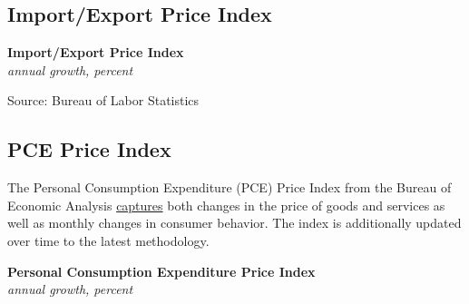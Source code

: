 \documentclass{report}
\makeatletter
\newcommand{\tbllink}[1]{\href{https://raw.githubusercontent.com/bdecon/US-chartbook/master/chartbook/data/#1}{\faTable}}
\newcommand*\short[1]{\expandafter\@gobbletwo\number\numexpr#1\relax}
\newcommand{\dateaxisticks}{
		date coordinates in=x, axis line style={draw=none},
		xmax={2021-06-15},
		max space between ticks=40,	    
		xtick={{1990-01-01}, {1992-01-01}, {1994-01-01}, 
			{1996-01-01}, {1998-01-01}, {2000-01-01}, 
			{2002-01-01}, {2004-01-01}, {2006-01-01},
			{2008-01-01}, {2010-01-01}, {2012-01-01}, {2014-01-01},
		    {2016-01-01}, {2018-01-01}, {2020-01-01}},
		minor xtick={{1989-01-01}, {1991-01-01}, {1993-01-01},
			{1995-01-01}, {1997-01-01}, {1999-01-01}, 
			{2001-01-01}, {2003-01-01}, {2005-01-01}, {2007-01-01},
		    {2009-01-01}, {2011-01-01}, {2013-01-01}, {2015-01-01},
		    {2017-01-01}, {2019-01-01}, {2021-01-01}},
		enlarge y limits={0.06}, enlarge x limits={0.01},
		}
\newcommand{\bbar}[2]{extra #1 ticks = {{#2}}, extra #1 tick labels = ,
		extra #1 tick style = {grid=major, grid style={thick, black!25}},}
\newcommand{\stdline}[4]{\addplot[very thick, no markers, color=#1] 
		table [x=#2, y=#3, col sep=comma] {#4};	}
\newcommand{\rbars}{
		\fill[color=black!10] (axis cs:{1990-07-01},\pgfkeysvalueof{/pgfplots/ymin}) rectangle 
			(axis cs:{1991-03-01}, \pgfkeysvalueof{/pgfplots/ymax});
		\fill[color=black!10] (axis cs:{2007-12-01},\pgfkeysvalueof{/pgfplots/ymin}) rectangle 
			(axis cs:{2009-07-01}, \pgfkeysvalueof{/pgfplots/ymax});
		\fill[color=black!10] (axis cs:{2001-03-01},\pgfkeysvalueof{/pgfplots/ymin}) rectangle 
			(axis cs:{2001-11-01}, \pgfkeysvalueof{/pgfplots/ymax});
		\fill[color=black!10] (axis cs:{2020-02-01},\pgfkeysvalueof{/pgfplots/ymin}) rectangle 
			(axis cs:{2021-06-15}, \pgfkeysvalueof{/pgfplots/ymax});}
\makeatother
\begin{document}
{{\newpage
\subsection*{\color{black!70} \seriffont Import/Export Price Index}
\begin{minipage}{0.76\textwidth}
\small 
\vspace{1mm}

\normalsize \textbf{Import/Export Price Index}\\
\footnotesize{\textit{annual growth, percent}}\\
\vspace{22mm}

\hspace{4mm} 
\vspace{1mm}

\footnotesize{Source: Bureau of Labor Statistics} \hfill \tbllink{mxpi.csv}
\vspace{8mm}

\subsection*{\color{black!70} \seriffont PCE Price Index}
\small The Personal Consumption Expenditure (PCE) Price Index from the Bureau of Economic Analysis \href{https://www.bea.gov/data/personal-consumption-expenditures-price-index}{captures} both changes in the price of goods and services as well as monthly changes in consumer behavior. The index is additionally updated over time to the latest methodology. 


\vspace{1mm}

\normalsize \textbf{Personal Consumption Expenditure Price Index}\\
\footnotesize{\textit{annual growth, percent}}\\
\vspace{26mm}


\end{minipage}}}
\end{document}
